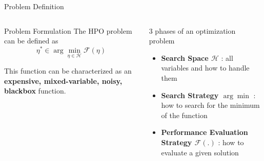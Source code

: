 \begin{frame}{Problem Definition}
   

    \begin{columns}
    
        \begin{column}[t]{0.45\textwidth}
            

            \begin{block}{Problem Formulation}
                The HPO problem can be defined as 
                \begin{equation}
                \eta^* \in \arg\min_{\eta \in \mathcal{H}} \mathcal{F}(\eta) 
                \end{equation}
            \end{block}

            This function can be characterized as an \large\textbf{expensive, mixed-variable, noisy, blackbox} function.
            \end{column}
        
        \begin{column}[t]{0.45\textwidth}
            \begin{block}{3 phases of an optimization problem}
                \begin{itemize}
                    \item \textbf{Search Space $\mathcal{H}$} : all variables and how to handle them
                    \item \textbf{Search Strategy $\arg\min$} : how to search for the minimum of the function
                    \item \textbf{Performance Evaluation Strategy $\mathcal{F}(.)$} : how to evaluate a given solution
                \end{itemize}
            \end{block}

        \end{column}
         
  \end{columns}
\end{frame}


